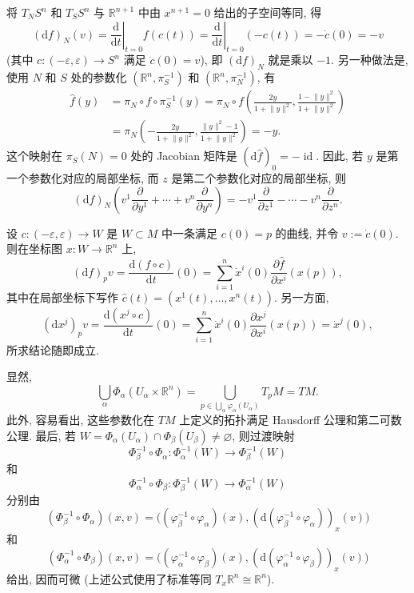 \begin{description}[font=\normalfont,leftmargin=2em,labelwidth=1.5em]
将 $T_NS^n$ 和 $T_SS^n$ 与 $\mathbb{R}^{n+1}$ 中由 $x^{n+1}=0$ 给出的子空间等同, 得
\[
  (\mathrm{d}f)_N(v)
  =\left.\frac{\mathrm{d}}{\mathrm{d}t}\right|_{t=0}f(c(t))
  =\left.\frac{\mathrm{d}}{\mathrm{d}t}\right|_{t=0}(-c(t))=-\dot c(0)=-v
\]
(其中 $c:(-\varepsilon,\varepsilon)\to S^n$ 满足 $\dot c(0)=v$), 即 $(\mathrm{d}f)_N$ 就是乘以 $-1$. 另一种做法是, 使用 $N$ 和 $S$ 处的参数化 $(\mathbb{R}^n,\pi_S^{-1})$ 和 $(\mathbb{R}^n,\pi_N^{-1})$, 有
\begin{align*}
  \widehat f(y)&=\pi_N\circ f\circ\pi_S^{-1}(y)
  =\pi_N\circ f\left(\frac{2y}{1+\lVert y\rVert^2},\frac{1-\lVert y\rVert^2}{1+\lVert y\rVert^2}\right)\\
  &=\pi_N\left(-\frac{2y}{1+\lVert y\rVert^2},\frac{\lVert y\rVert^2-1}{1+\lVert y\rVert^2}\right)=-y.
\end{align*}
这个映射在 $\pi_S(N)=0$ 处的 Jacobian 矩阵是 $(\mathrm{d}\widehat f)_0=-\operatorname{id}$. 因此, 若 $y$ 是第一个参数化对应的局部坐标, 而 $z$ 是第二个参数化对应的局部坐标, 则
\[
  (\mathrm{d}f)_N\left(v^1\frac{\partial}{\partial y^1}+\cdots+v^n\frac{\partial}{\partial y^n}\right)
  =-v^1\frac{\partial}{\partial z^1}-\cdots-v^n\frac{\partial}{\partial z^n}.
\]

设 $c:(-\varepsilon,\varepsilon)\to W$ 是 $W\subset M$ 中一条满足 $c(0)=p$ 的曲线, 并令 $v:=\dot c(0)$. 则在坐标图 $x:W\to\mathbb{R}^n$ 上,
\[
  (\mathrm{d}f)_pv=\frac{\mathrm{d}(f\circ c)}{\mathrm{d}t}(0)
  =\sum_{i=1}^n\dot{x}^i(0)\frac{\partial\widehat f}{\partial x^i}(x(p)),
\]
其中在局部坐标下写作 $\widehat c(t)=(x^1(t),\ldots,x^n(t))$. 另一方面,
\[
  (\mathrm{d}x^j)_pv=\frac{\mathrm{d}(x^j\circ c)}{\mathrm{d}t}(0)
  =\sum_{i=1}^n\dot{x}^i(0)\frac{\partial x^j}{\partial x^i}(x(p))=\dot{x}^j(0),
\]
所求结论随即成立.

显然,
\[
  \bigcup_\alpha\Phi_\alpha(U_\alpha\times\mathbb{R}^n)
  =\bigcup_{p\in\bigcup_\alpha\varphi_\alpha(U_\alpha)}T_pM=TM.
\]
此外, 容易看出, 这些参数化在 $TM$ 上定义的拓扑满足 Hausdorff 公理和第二可数公理. 最后, 若 $W=\Phi_\alpha(U_\alpha)\cap\Phi_\beta(U_\beta)\ne\varnothing$, 则过渡映射
\[
  \Phi_\beta^{-1}\circ\Phi_\alpha:\Phi_\alpha^{-1}(W)\to\Phi_\beta^{-1}(W)
\]
和
\[
  \Phi_\alpha^{-1}\circ\Phi_\beta:\Phi_\beta^{-1}(W)\to\Phi_\alpha^{-1}(W)
\]
分别由
\[
  (\Phi_\beta^{-1}\circ\Phi_\alpha)(x,v)
  =\bigl((\varphi_\beta^{-1}\circ\varphi_\alpha)(x),(\mathrm{d}(\varphi_\beta^{-1}\circ\varphi_\alpha))_x(v)\bigr)
\]
和
\[
  (\Phi_\alpha^{-1}\circ\Phi_\beta)(x,v)
  =\bigl((\varphi_\alpha^{-1}\circ\varphi_\beta)(x),(\mathrm{d}(\varphi_\alpha^{-1}\circ\varphi_\beta))_x(v)\bigr)
\]
给出, 因而可微 (上述公式使用了标准等同 $T_x\mathbb{R}^n\cong\mathbb{R}^n$).
\end{description}
